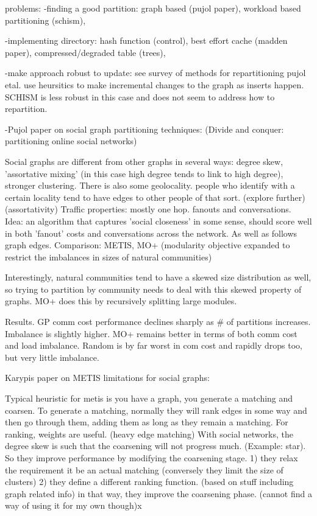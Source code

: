 \documentclass{article}
\begin{document}
problems:
-finding a good partition:
graph based (pujol paper), workload based partitioning (schism), 

-implementing directory:
hash function (control), best effort cache (madden paper), compressed/degraded table (trees), 

-make approach robust to update:
see survey of methods for repartitioning
pujol etal. use heursitics to make incremental changes to the graph as inserts happen.
SCHISM is less robust in this case and does not seem to address how to repartition.

-Pujol paper on social graph partitioning techniques: (Divide and conquer: partitioning online social networks)

Social graphs are different from other graphs in several ways: degree skew, 'assortative mixing' (in this case high degree tends to link to high degree), 
stronger clustering.
There is also some geolocality. people who identify with a certain locality tend to have edges to other people of that sort. (explore further) (assortativity)
Traffic properties: mostly one hop. fanouts and conversations. 
Idea: an algorithm that captures 'social closeness' in some sense, should score well in both 'fanout' costs and
conversations across the network. As well as follows graph edges.
Comparison: METIS, MO+ (modularity objective expanded to restrict the imbalances in sizes of natural communities)

Interestingly, natural communities tend to have a skewed size distribution as well, so trying to partition by community needs to deal 
with this skewed property of graphs.  MO+ does this by recursively splitting large modules. 

Results.  GP comm cost performance declines sharply as # of partitions increases. Imbalance is slightly higher.
MO+ remains better in terms of both comm cost and load imbalance.
Random is by far worst in com cost and rapidly drops too, but very little imbalance.

Karypis paper on METIS limitations for social graphs:

Typical heuristic for metis is you have a graph, you generate a matching and coarsen. 
To generate a matching, normally they will rank edges in some way and then go through them, adding them 
as long as they remain a matching. For ranking, weights are useful. (heavy edge matching)
With social networks, the degree skew is such that the coarsening will not progress much. 
(Example: star). So they improve performance by modifying the coarsening stage. 1) they relax the requirement it be an actual
matching (conversely they limit the size of clusters) 2) they define a different ranking function. (based on stuff including graph related info)
in that way, they improve the coarsening phase. (cannot find a way of using it for my own though)x
\end{document}
